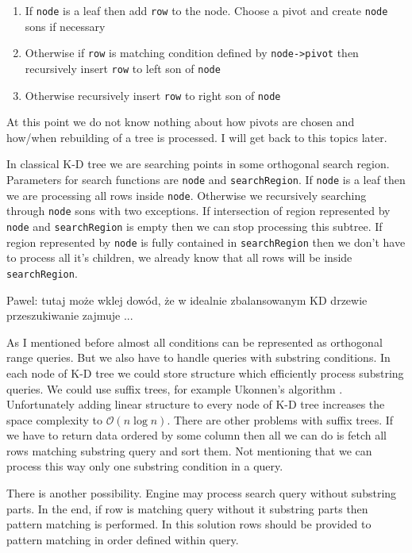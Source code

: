 \documentclass[10pt,a4paper]{article}
\newcommand{\pawel}[1]{\noindent\colorbox{myRed}{Pawel: #1}}
\newcommand{\Oh}{\mathcal{O}}
\begin{document}
\begin{enumerate}
\item If \verb|node| is a leaf then add \verb|row| to the node. Choose a pivot and create \verb|node| sons if necessary
\item Otherwise if \verb|row| is matching condition defined by \verb|node->pivot| then recursively insert \verb|row| to left son of \verb|node|
\item Otherwise recursively insert \verb|row| to right son of \verb|node|
\end{enumerate}

At this point we do not know nothing about how pivots are chosen and how/when rebuilding of a tree is processed. I will get back to this topics later.

In classical K-D tree we are searching points in some orthogonal search region. Parameters for search functions are \verb|node| and \verb|searchRegion|. If \verb|node| is a leaf then we are processing all rows inside \verb|node|. Otherwise we recursively searching through \verb|node| sons with two exceptions. If intersection of region represented by \verb|node| and \verb|searchRegion| is empty then we can stop processing this subtree. If region represented by \verb|node| is fully contained in \verb|searchRegion| then we don't have to process all it's children, we already know that all rows will be inside \verb|searchRegion|.

\pawel{tutaj może wklej dowód, że w idealnie zbalansowanym KD drzewie przeszukiwanie zajmuje ...}

As I mentioned before almost all conditions can be represented as orthogonal range queries. But we also have to handle queries with substring conditions. In each node of K-D tree we could store structure which efficiently process substring queries. We could use suffix trees, for example Ukonnen's algorithm \cite{STUKK}. Unfortunately adding linear structure to every node of K-D tree increases the space complexity to $\Oh(n \log n)$. There are other problems with suffix trees. If we have to return data ordered by some column then all we can do is fetch all rows matching substring query and sort them. Not mentioning that we can process this way only one substring condition in a query.

There is another possibility. Engine may process search query without substring parts. In the end, if row is matching query without it substring parts then pattern matching is performed. In this solution rows should be provided to pattern matching in order defined within query.
\end{document}
